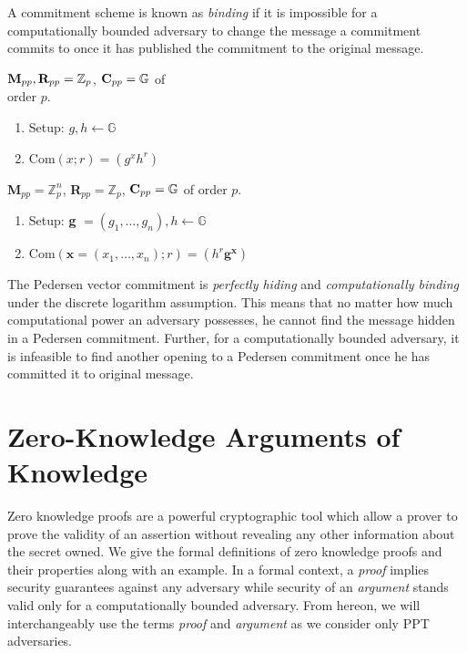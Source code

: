 A commitment scheme is known as \textit{binding} if it is impossible for a computationally bounded adversary to change the message a commitment commits to once it has published the commitment to the original message.

\begin{defn}
    ${\normalfont \textbf{M}}_{pp}, {\normalfont \textbf{R}}_{pp} = \mathbb{Z}_p$, ${\normalfont \textbf{C}}_{pp} = \mathbb{G}$ of \\order $p$.
    \begin{enumerate}
        \item {\normalfont Setup}: $g, h \leftarrow \mathbb{G}$
        \item {\normalfont Com}$(x; r) = (g^x h^r)$
    \end{enumerate}
\end{defn}

\begin{defn}
    {\normalfont \textbf{M}}$_{pp} = \mathbb{Z}_p^n$, {\normalfont \textbf{R}}$_{pp} = \mathbb{Z}_p$, ${\normalfont \textbf{C}}_{pp} = \mathbb{G}$ of order $p$.
    \begin{enumerate}
        \item {\normalfont Setup}: \textbf{g} $= (g_1, \dots, g_n), h \leftarrow \mathbb{G}$
        \item {\normalfont Com}$(\textbf{x} = (x_1, \dots, x_n); r) = (h^r \textbf{g}^{\textbf{x}})$
    \end{enumerate}
\end{defn}

The Pedersen vector commitment is \textit{perfectly hiding} and \textit{computationally binding} under the
discrete logarithm assumption. This means that no matter how much computational power an adversary possesses, he cannot find the message hidden in a Pedersen commitment.
Further, for a computationally bounded adversary, it is infeasible to find another opening to a Pedersen commitment once he has committed it to original message.

\section{Zero-Knowledge Arguments of Knowledge}

Zero knowledge proofs are a powerful cryptographic tool which allow a prover to prove the validity of an assertion without revealing any other information about the secret owned.
We give the formal definitions of zero knowledge proofs and their properties along with an example.
In a formal context, a \textit{proof} implies security guarantees against any adversary while security of an \textit{argument} stands valid only for a computationally bounded adversary.  
From hereon, we will interchangeably use the terms \textit{proof} and \textit{argument} as we consider only \textsf{PPT} adversaries.


